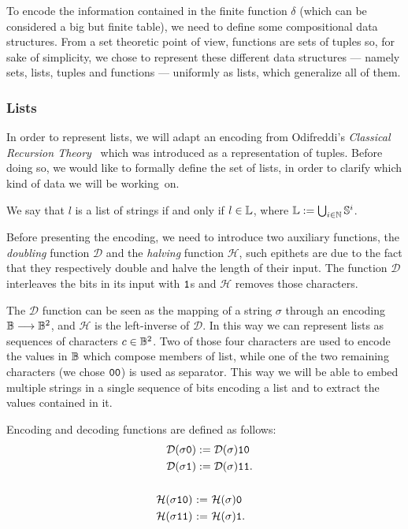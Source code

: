 To encode the information contained in the finite function $\delta$
(which can be considered a big but finite table), we need to define some
compositional data structures.
From a set theoretic point of view, functions are sets of tuples so, for sake of simplicity, we chose to
represent these different data structures --- namely sets, lists, tuples and functions ---
uniformly as lists, which generalize all of them.


\subsubsection{{Lists}}


In order to represent lists, we will adapt an encoding
from Odifreddi's \emph{Classical Recursion Theory}~\cite[p. 183]{Odifreddi}
which was introduced as a representation of tuples.
%
Before doing so, we would like to formally define the set of lists, in order
to clarify which kind of data we will be working~on.

\begin{defn}
  \label{def:enclists}
  We say that $l$ is a list of strings if and only if $l \in \mathbb{L}$, where
  $\mathbb{L} := \bigcup_{i\in \mathbb{N}} \mathbb{S}^i$.
\end{defn}

Before presenting the encoding, we need to introduce two auxiliary functions,
the \emph{doubling} function $\mathcal{D}$ and the \emph{halving} function $\mathcal{H}$,
such epithets are due to the fact that they respectively double and halve the length
of their input. The function $\mathcal{D}$ interleaves
the bits in its input with $\mathtt{1}$s and $\mathcal{H}$
removes those characters.

The $\mathcal{D}$ function can be seen as the mapping of a string $\sigma$ through an
encoding $\mathbb{B} \longrightarrow \mathbb{B}^2$, and $\mathcal{H}$ is the
left-inverse of $\mathcal{D}$.
In this way we can represent lists as sequences of characters
$c \in \mathbb{B}^2$. Two of those four characters are used to encode the
values in $\mathbb{B}$ which compose members of list, while
one of the two remaining characters (we chose $\mathtt{0}\mathtt{0}$) is used
as separator. This way we will be able to embed multiple strings in a single
sequence of bits encoding a list and to extract the values contained in it.

\begin{defn}
  \label{def:df}
Encoding and decoding functions
are defined as follows:
\begin{align*}
\mathcal D(\sigma\zero) &:= \mathcal D(\sigma)\one\zero \\
%
\mathcal D(\sigma\one) &:= \mathcal D(\sigma)\one\one. \\
\\
%
\mathcal H(\sigma\one\zero) \ &{:=} \
\mathcal H(\sigma)\zero \\
%
\mathcal H(\sigma\one\one) \ &{:=} \ \mathcal H(\sigma)\one.
\end{align*}
\end{defn}
%
%
\noindent

